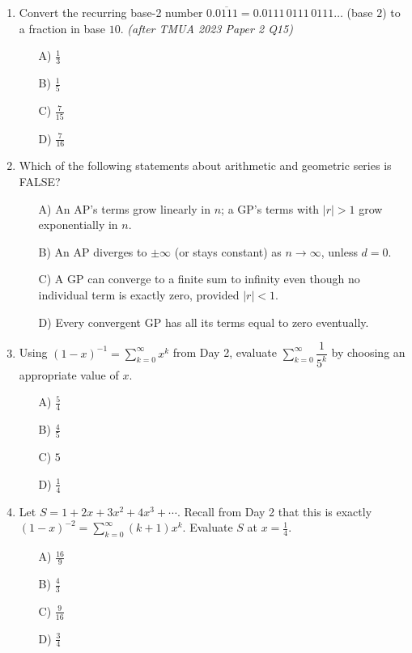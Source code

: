 \documentclass[11pt,a4paper]{article}
\begin{document}
\begin{enumerate}
\item Convert the recurring base-2 number $0.\overline{0111}=0.0111\,0111\,0111\ldots$ (base $2$) to a fraction in base $10$. \textit{\small(after TMUA 2023 Paper 2 Q15)}
\begin{itemize}
\item[A)] $\tfrac13$
\item[B)] $\tfrac15$
\item[C)] $\tfrac7{15}$
\item[D)] $\tfrac7{16}$
\end{itemize}

\item Which of the following statements about arithmetic and geometric series is FALSE?
\begin{itemize}
\item[A)] An AP's terms grow linearly in $n$; a GP's terms with $|r|>1$ grow exponentially in $n$.
\item[B)] An AP diverges to $\pm\infty$ (or stays constant) as $n\to\infty$, unless $d=0$.
\item[C)] A GP can converge to a finite sum to infinity even though no individual term is exactly zero, provided $|r|<1$.
\item[D)] Every convergent GP has all its terms equal to zero eventually.
\end{itemize}

\item Using $(1-x)^{-1}=\sum_{k=0}^\infty x^k$ from Day 2, evaluate $\displaystyle\sum_{k=0}^\infty\dfrac1{5^k}$ by choosing an appropriate value of $x$.
\begin{itemize}
\item[A)] $\tfrac54$
\item[B)] $\tfrac45$
\item[C)] $5$
\item[D)] $\tfrac14$
\end{itemize}

\item Let $S=1+2x+3x^2+4x^3+\cdots$. Recall from Day 2 that this is exactly $(1-x)^{-2}=\sum_{k=0}^\infty(k+1)x^k$. Evaluate $S$ at $x=\tfrac14$.
\begin{itemize}
\item[A)] $\tfrac{16}9$
\item[B)] $\tfrac43$
\item[C)] $\tfrac9{16}$
\item[D)] $\tfrac34$
\end{itemize}

\end{enumerate}
\end{document}
